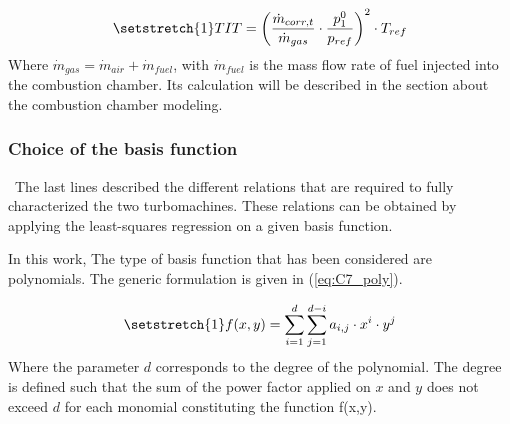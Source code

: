 \begin{equation}
    \setstretch{1}
    TIT = \left(\frac{\dot{m}_{corr,t}}{\dot{m}_{gas}}\cdot\frac{p_1^0}{p_{ref}}\right)^2\cdot T_{ref}\label{eq:C7_TIT}
\end{equation}
Where $\dot{m}_{gas} = \dot{m}_{air} + \dot{m}_{fuel}$, with $\dot{m}_{fuel}$ is the mass flow rate of fuel injected into the combustion chamber. Its calculation will be described in the section about the combustion chamber modeling.

\subsubsection{Choice of the basis function}
\quad\ The last lines described the different relations that are required to fully characterized the two turbomachines. These relations can be obtained by applying the least-squares regression on a given basis function. 

In this work, The type of basis function that has been considered are polynomials. The generic formulation is given in (\ref{eq:C7_poly}).

\begin{equation}
    \setstretch{1}
    f(x,y) = \sum_{i=1}^d\sum_{j=1}^{d-i}a_{i,j}\cdot x^i\cdot y^j \label{eq:C7_poly}
\end{equation}
Where the parameter $d$ corresponds to the degree of the polynomial. The degree is defined such that the sum of the power factor applied on $x$ and $y$ does not exceed $d$ for each monomial constituting the function f(x,y).

